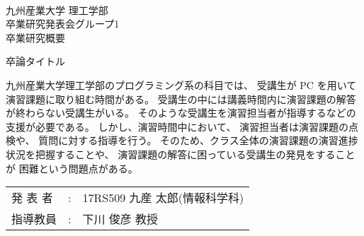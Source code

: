 \documentclass[uplatex,a4paper,12pt]{jsarticle}
\title
\renewcommand{\author}[1]{\def\author{#1}}
\renewcommand{\title}[1]{\def\title{#1}}
\newcommand{\supervisor}[1]{\def\supervisor{#1}}
\newcommand{\group}[1]{\def\group{#1}}
\newcommand{\makeheader}{
\newpage
\noindent\\九州産業大学 理工学部
\noindent\\卒業研究発表会グループ\group
\noindent\\卒業研究概要
\vskip 20mm
\begin{center}
  \title 
\end{center}
\vskip 15mm
}
\newcommand{\maketailer}{
\vskip 20mm
\begin{center}
\setlength{\tabcolsep}{1mm}
\begin{tabular}[h]{p{4zw}p{1em}l}
 発 表 者&:& \author (情報科学科)\\
 指導教員&:& \supervisor
\end{tabular}
\end{center}
}
\newenvironment{rsabst}{\makeheader}{\maketailer}
\begin{document}
\title{卒論タイトル}
\author{17RS509 九産 太郎}
\supervisor{下川 俊彦 教授}
\group{1}

\begin{rsabst}

九州産業大学理工学部のプログラミング系の科目では、
受講生が PC を用いて演習課題に取り組む時間がある。
受講生の中には講義時間内に演習課題の解答が終わらない受講生がいる。
そのような受講生を演習担当者が指導するなどの支援が必要である。
しかし、演習時間中において、
演習担当者は演習課題の点検や、
質問に対する指導を行う。
そのため、クラス全体の演習課題の演習進捗状況を把握することや、
演習課題の解答に困っている受講生の発見をすることが
困難という問題点がある。


\end{rsabst}
\end{document}
